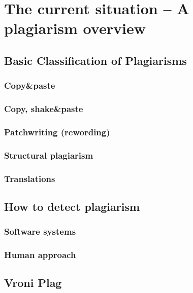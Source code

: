 \chapter{The current situation -- A plagiarism overview}

\section{Basic Classification of Plagiarisms}

\subsection{Copy\&paste}
\subsection{Copy, shake\&paste}
\subsection{Patchwriting (rewording)}
\subsection{Structural plagiarism}
\subsection{Translations}

\section{How to detect plagiarism}
\subsection{Software systems}
\subsection{Human approach}

\section{Vroni Plag}
